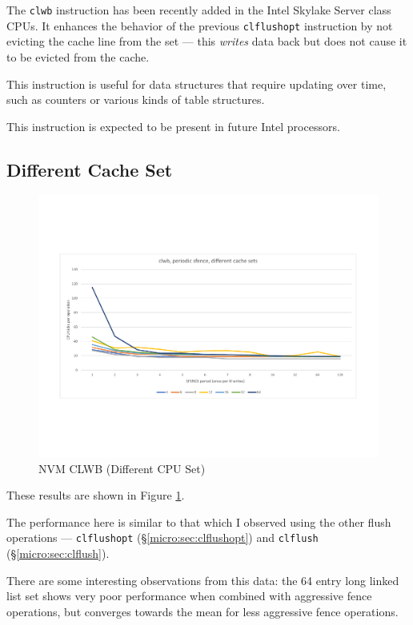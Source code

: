 The \texttt{clwb} instruction has been recently added in the 
Intel Skylake Server class CPUs.  It enhances the behavior of
the previous \texttt{clflushopt} instruction by not
evicting the cache line from the set --- this \textit{writes}
data back but does not cause it to be evicted from the cache.

This instruction is useful for data structures that require
updating over time, such as counters or various kinds of
table structures.

This instruction is expected to be present in future Intel processors.

\subsection{Different Cache Set}

\begin{figure}
    \centering
    \caption{NVM CLWB (Different CPU Set)}\label{micro:clwb:different}
    \includegraphics[scale=0.35]{micro/nvm-clwb-periodic-different.pdf}
\end{figure}

These results are shown in Figure \ref{micro:clwb:different}.

The performance here is similar to that which I observed
using the other flush operations --- \texttt{clflushopt} (\S \ref{micro:sec:clflushopt}) and \texttt{clflush} (\S \ref{micro:sec:clflush}).

There are some interesting observations from this data: the 64 entry long linked list set shows very poor performance when combined with aggressive fence operations, but converges towards the mean for less aggressive fence operations.

